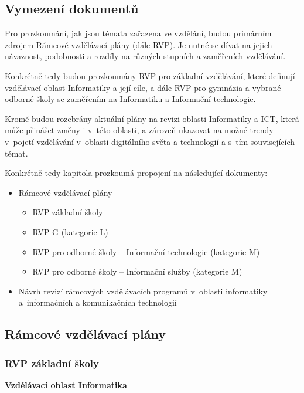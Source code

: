 \subsection{Vymezení dokumentů}

Pro prozkoumání, jak jsou témata zařazena ve vzdělání, budou primárním zdrojem Rámcové vzdělávací plány (dále RVP). Je nutné se dívat na jejich návaznost, podobnosti a rozdíly na různých stupních a zaměřeních vzdělávání.

Konkrétně tedy budou prozkoumány RVP pro základní vzdělávání, které definují vzdělávací oblast Informatiky a její cíle, a dále RVP pro gymnázia a vybrané odborné školy se zaměřením na Informatiku a Informační technologie. 

Kromě budou rozebrány aktuální plány na revizi oblasti Informatiky a ICT, která může přinášet změny i v~této oblasti, a zároveň ukazovat na možné trendy v~pojetí vzdělávání v~oblasti digitálního světa a technologií a s~tím souvisejících témat.

Konkrétně tedy kapitola prozkoumá propojení na následující dokumenty:

\begin{itemize}
\item Rámcové vzdělávací plány
	\begin{itemize}
    \item RVP základní školy \citep{rvp-zs}
    \item RVP-G (kategorie L) \citep{rvp-g}
    \item RVP pro odborné školy -- Informační technologie \citep{rvp-it} (kategorie M)
    \item RVP pro odborné školy -- Informační služby\citep{rvp-is} (kategorie M)
	\end{itemize}
\item Návrh revizí rámcových vzdělávacích programů v oblasti informatiky a informačních a komunikačních technologií \citep{revize}
\end{itemize}

\subsection{Rámcové vzdělávací plány}

\subsubsection*{RVP základní školy}

\textbf{Vzdělávací oblast Informatika}

